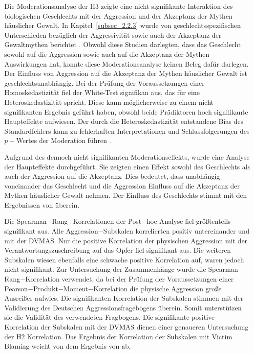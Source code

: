 Die Moderationsanalyse der H3 zeigte eine nicht signifikante Interaktion des biologischen Geschlechts mit der Aggression und der Akzeptanz der Mythen häuslicher Gewalt. In Kapitel~\ref{subsec_2.2.3} wurde von geschlechtsspezifischen Unterschieden bezüglich der Aggressivität sowie auch der Akzeptanz der Gewaltmythen berichtet \parencite{H2_u_3_Bhogal_2016, H3_MFUnterschied, H3_2020}. Obwohl diese Studien darlegten, dass das Geschlecht sowohl auf die Aggression sowie auch auf die Akzeptanz der Mythen Auswirkungen hat, konnte diese Moderationsanalyse keinen Beleg dafür darlegen. Der Einfluss von Aggression auf die Akzeptanz der Mythen häuslicher Gewalt ist geschlechtsunabhängig. Bei der Prüfung der Voraussetzungen einer Homoskedastizität fiel der White-Test signifikan aus, das für eine Heteroskedastizität spricht. Diese kann möglicherweise zu einem nicht signifikanten Ergebnis geführt haben, obwohl beide Prädiktoren hoch signifikante Haupteffekte aufwiesen.
Der durch die Heteroskedastizität entstandene Bias des Standardfehlers kann zu fehlerhaften Interpretationen und Schlussfolgerungen des $p-$Wertes der Moderation führen \parencite{Voraussetzung_Moderation}. 

Aufgrund des dennoch nicht signifikanten Moderationseffekts, wurde eine Analyse der Haupteffekte durchgeführt. Sie zeigten einen Effekt sowohl des Geschlechts als auch der Aggression auf die Akzeptanz. Dies bedeutet, dass unabhängig voneinander das Geschlecht und die Aggression Einfluss auf die Akzeptanz der Mythen häuslicher Gewalt nehmen. Der Einfluss des Geschlechts stimmt mit den Ergebnissen von \textcite{H3_2020} überein.


Die Spearman$-$Rang$-$Korrelationen der Post$-$hoc Analyse fiel größtenteils signifikant aus. Alle Aggression$-$Subskalen korrelierten positiv untereinander und mit der DVMAS. Nur die positive Korrelation der physischen Aggression mit der Verantwortungszuschreibung auf das Opfer fiel signifikant aus. Die weiteren Subskalen wiesen ebenfalls eine schwache positive Korrelation auf, waren jedoch nicht signifikant. Zur Untersuchung der Zusammenhänge wurde die Spearman$-$Rang$-$Korrelation verwendet, da bei der Prüfung der Voraussetzungen einer Pearson$-$Produkt$-$Moment$-$Korrelation die physische Aggression große Ausreißer aufwies. Die signifikanten Korrelation der Subskalen stimmen mit der Validierung des Deutschen Aggressionsfragebogens \parencite{Aggressionsfragebogen} überein. Somit unterstützen sie die Validität des verwendeten Fragbogens. Die signifikante positive Korrelation der Subskalen mit der DVMAS dienen einer genaueren Untersuchung der H2 Korrelation. Das Ergebnis der Korrelation der Subskalen mit Victim Blaming weicht von dem Ergebnis von \textcite{H1_moderation_2020} ab. 



